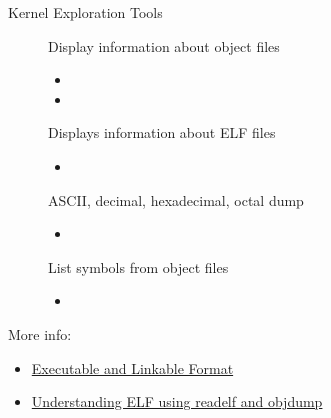 \begin{frame}{Kernel Exploration Tools}
  \begin{description}
  \item[] Display information about object files
    \begin{itemize}
    \item[] 
    \item[] 
    \end{itemize}
  \item[] Displays information about ELF files
    \begin{itemize}
    \item[] 
    \end{itemize}
  \item[] ASCII, decimal, hexadecimal, octal dump
    \begin{itemize}
    \item[] 
    \end{itemize}
  \item[] List symbols from object files
    \begin{itemize}
    \item[] 
    \end{itemize}
  \end{description}
\end{frame}

More info:
\begin{itemize}
\item \href{http://en.wikipedia.org/wiki/Executable_and_Linkable_Format}{Executable and
    Linkable Format}
\item
  \href{http://www.linuxforums.org/articles/understanding-elf-using-readelf-and-objdump_125.html}{Understanding
    ELF using readelf and objdump}
\end{itemize}


